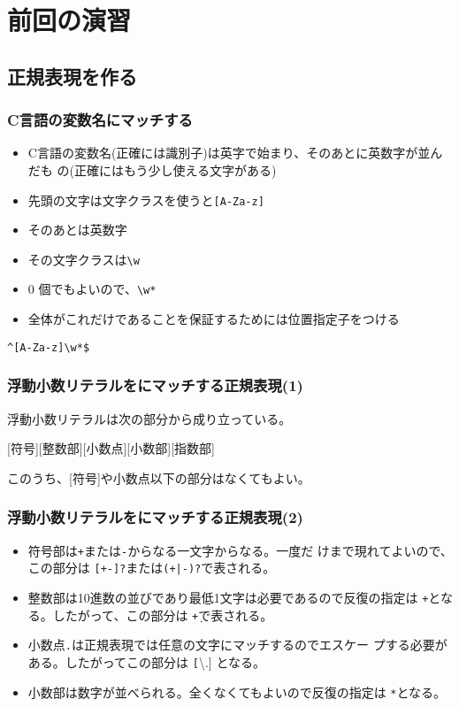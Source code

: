 \documentclass[dvipsk]{beamer}
\begin{document}
\iffalse
\begin{frame}[containsverbatim]
 \frametitle{}
\end{frame}
\begin{frame}[containsverbatim]
 \frametitle{}
\end{frame}
\fi
\section{前回の演習}
\subsection{正規表現を作る}
\begin{frame}[containsverbatim]
 \frametitle{C言語の変数名にマッチする}
\begin{itemize}
 \item C言語の変数名(正確には識別子)は英字で始まり、そのあとに英数字が並んだも
の(正確にはもう少し使える文字がある)
 \item 先頭の文字は文字クラスを使うと\texttt{[A-Za-z]}
 \item そのあとは英数字
 \item その文字クラスは\texttt{\textbackslash w}
 \item $0$ 個でもよいので、\texttt{\textbackslash w*}
 \item 全体がこれだけであることを保証するためには位置指定子をつける
\end{itemize}
{\LARGE
\verb+^[A-Za-z]\w*$+}
\end{frame}
\begin{frame}[containsverbatim]
 \frametitle{浮動小数リテラルをにマッチする正規表現(1)}
浮動小数リテラルは次の部分から成り立っている。

[符号][整数部][小数点][小数部][指数部]

このうち、[符号]や小数点以下の部分はなくてもよい。

\end{frame}
\begin{frame}[containsverbatim]
 \frametitle{浮動小数リテラルをにマッチする正規表現(2)}
\begin{itemize}
 \item 符号部は\texttt{+}または\texttt{-}からなる一文字からなる。一度だ
       けまで現れてよいので、この部分は \texttt{[+-]?}または\texttt{(+|-)?}で表される。
 \item 整数部は10進数の並びであり最低1文字は必要であるので反復の指定は
       \texttt{+}となる。したがって、この部分は \texttt{\d+}で表される。
 \item 小数点\texttt{.}は正規表現では任意の文字にマッチするのでエスケー
       プする必要がある。したがってこの部分は \texttt[\textbackslash .]
       となる。
 \item 小数部は数字が並べられる。全くなくてもよいので反復の指定は
       \texttt{*}となる。
\end{itemize}
\end{frame}
\end{document}
